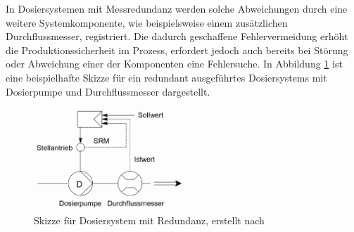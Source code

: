 In Dosiersystemen mit Messredundanz werden solche Abweichungen durch eine weitere Systemkomponente, wie beispielsweise einem zusätzlichen Durchflussmesser, registriert. Die dadurch geschaffene Fehlervermeidung erhöht die Produktionssicherheit im Prozess, erfordert jedoch auch bereits bei Störung oder Abweichung einer der Komponenten eine Fehlersuche. In Abbildung \ref{fig:redundanz} ist eine beispielhafte Skizze für ein redundant ausgeführtes Dosiersystems mit Dosierpumpe und Durchflussmesser dargestellt.\,\cite{Vetter.2002}

\begin{figure}[h!]
	\centering
	\includegraphics[width=0.5\textwidth]{img/redundanz}
	\caption{Skizze für Dosiersystem mit Redundanz, erstellt nach \cite{Vetter.2002}}
	\label{fig:redundanz}
\end{figure}
\FloatBarrier


